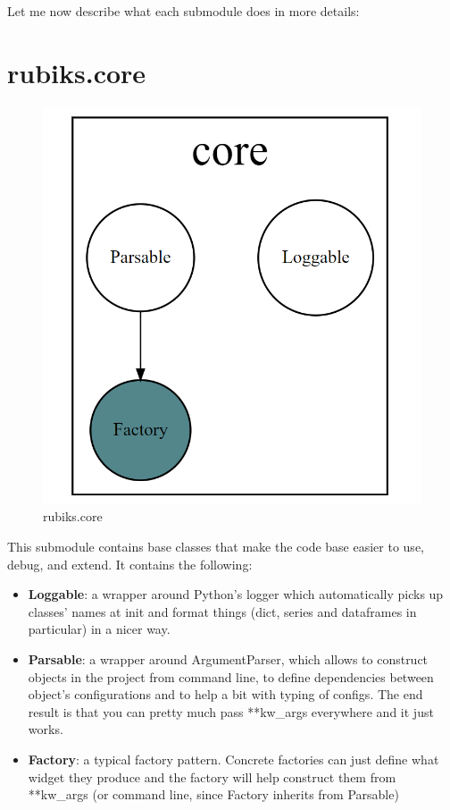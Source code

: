 Let me now describe what each submodule does in more details:

\section{rubiks.core}
\begin{figure}[H]
\centering
\includegraphics[scale=0.25]{./Figures/codebasecore}
\caption[Codebase]{rubiks.core}
\label{fig:Codebasecore}
\end{figure}
This submodule contains base classes that make the code base easier to use, debug, and extend. It contains the following:
\begin{itemize}
\item \textbf{Loggable}: a wrapper around Python's logger which automatically picks up classes' names at init and format things (dict, series and dataframes in particular) in a nicer way.
\item \textbf{Parsable}: a wrapper around ArgumentParser, which allows to construct objects in the project from command line, to define dependencies between object's configurations and to help a bit with typing of configs. The end result is that you can pretty much pass **kw\_args everywhere and it just works.
\item \textbf{Factory}: a typical factory pattern. Concrete factories can just define what widget they produce and the factory will help construct them from **kw\_args (or command line, since Factory inherits from Parsable)
\end{itemize}

